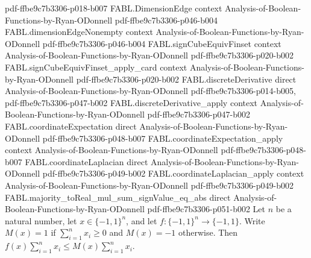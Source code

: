 \begin{theorem}
  {pdf-ffbe9c7b3306-p018-b007}
\proofstep
  {FABL.DimensionEdge}
  {context}
  {Analysis-of-Boolean-Functions-by-Ryan-ODonnell}
  {pdf-ffbe9c7b3306-p046-b004}
\proofstep
  {FABL.dimensionEdgeNonempty}
  {context}
  {Analysis-of-Boolean-Functions-by-Ryan-ODonnell}
  {pdf-ffbe9c7b3306-p046-b004}
\proofstep
  {FABL.signCubeEquivFinset}
  {context}
  {Analysis-of-Boolean-Functions-by-Ryan-ODonnell}
  {pdf-ffbe9c7b3306-p020-b002}
\proofstep
  {FABL.signCubeEquivFinset_apply_card}
  {context}
  {Analysis-of-Boolean-Functions-by-Ryan-ODonnell}
  {pdf-ffbe9c7b3306-p020-b002}
\proofstep
  {FABL.discreteDerivative}
  {direct}
  {Analysis-of-Boolean-Functions-by-Ryan-ODonnell}
  {pdf-ffbe9c7b3306-p014-b005,
    pdf-ffbe9c7b3306-p047-b002}
\proofstep
  {FABL.discreteDerivative_apply}
  {context}
  {Analysis-of-Boolean-Functions-by-Ryan-ODonnell}
  {pdf-ffbe9c7b3306-p047-b002}
\proofstep
  {FABL.coordinateExpectation}
  {direct}
  {Analysis-of-Boolean-Functions-by-Ryan-ODonnell}
  {pdf-ffbe9c7b3306-p048-b007}
\proofstep
  {FABL.coordinateExpectation_apply}
  {context}
  {Analysis-of-Boolean-Functions-by-Ryan-ODonnell}
  {pdf-ffbe9c7b3306-p048-b007}
\proofstep
  {FABL.coordinateLaplacian}
  {direct}
  {Analysis-of-Boolean-Functions-by-Ryan-ODonnell}
  {pdf-ffbe9c7b3306-p049-b002}
\proofstep
  {FABL.coordinateLaplacian_apply}
  {context}
  {Analysis-of-Boolean-Functions-by-Ryan-ODonnell}
  {pdf-ffbe9c7b3306-p049-b002}
\proofstep
  {FABL.majority_toReal_mul_sum_signValue_eq_abs}
  {direct}
  {Analysis-of-Boolean-Functions-by-Ryan-ODonnell}
  {pdf-ffbe9c7b3306-p051-b002}
Let $n$ be a natural number, let $x\in\{-1,1\}^n$, and let $f:\{-1,1\}^n\to\{-1,1\}$.
Write $M(x)=1$ if $\sum_{i=1}^n x_i\ge0$ and $M(x)=-1$ otherwise. Then $f(x)\sum_{i=1}^n
x_i\le M(x)\sum_{i=1}^n x_i$.
\end{theorem}


